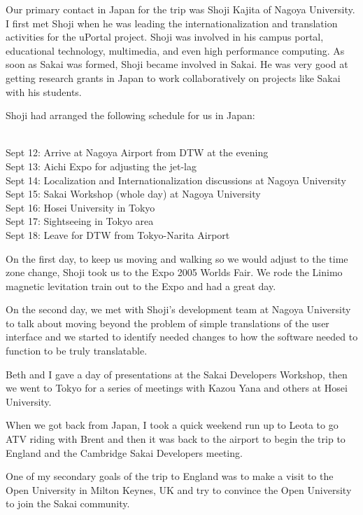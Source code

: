 \documentclass[12pt]{book}
\begin{document}
Our primary contact in Japan for the trip was
Shoji Kajita of Nagoya University.   I first met Shoji
when he was leading the internationalization and
translation activities for the uPortal project.  Shoji
was involved in his campus portal, educational technology,
multimedia, and even high performance computing. As soon
as Sakai was formed, Shoji became involved in Sakai.
He was very good at getting research grants in Japan
to work collaboratively on projects like Sakai with his
students.

Shoji had arranged the following schedule for us
in Japan:\\
\\
\begin{sf}
Sept 12: Arrive at Nagoya Airport from DTW at the evening\\
Sept 13: Aichi Expo for adjusting the jet-lag\\
Sept 14: Localization and Internationalization discussions at Nagoya University\\
Sept 15: Sakai Workshop (whole day) at Nagoya University\\
Sept 16: Hosei University in Tokyo\\
Sept 17: Sightseeing in Tokyo area\\
Sept 18: Leave for DTW from Tokyo-Narita Airport\\
\end{sf}

On the first day, to keep us moving and walking
so we would adjust to the time zone change,
Shoji took us to the Expo 2005 Worlds Fair.
We rode the Linimo magnetic levitation train
out to the Expo and had a great day.

On the second day, we met with Shoji's development
team at Nagoya University to talk about
moving beyond the problem of
simple translations of the user interface and we started
to identify needed changes to how the software
needed to function to be truly translatable.

Beth and I gave a day of presentations at the
Sakai Developers Workshop, then we went to
Tokyo for a series of meetings with Kazou Yana
and others at Hosei University.

When we got back from Japan, I took a quick weekend
run up to Leota to go ATV riding with Brent and
then it was back to the airport to begin the trip
to England and the Cambridge Sakai Developers
meeting.

One of my secondary goals of the trip to England was to make a
visit to the Open University in Milton Keynes, UK and
try to convince the Open University to join the Sakai
community.
\end{document}
